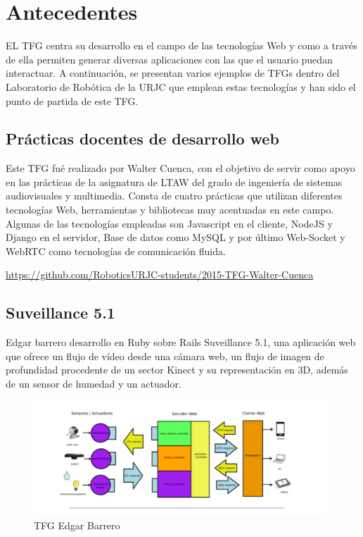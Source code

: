 \section{Antecedentes}
EL TFG centra su desarrollo en el campo de las tecnologías Web y como a través de ella permiten generar diversas aplicaciones con las que el usuario puedan interactuar. A continuación, se presentan varios ejemplos de TFGs dentro del Laboratorio de Robótica de la URJC que emplean estas tecnologías y han sido el punto de partida de este TFG.

\subsection{Prácticas docentes de desarrollo web}
Este TFG fué realizado por Walter Cuenca, con el objetivo de servir como apoyo en las prácticas de la asignatura de LTAW del grado de ingeniería de sistemas audiovisuales y multimedia. Consta de cuatro prácticas que utilizan diferentes tecnologías Web, herramientas y bibliotecas muy acentuadas en este campo. Algunas de las tecnologías empleadas son Javascript en el cliente, NodeJS y Django en el servidor, Base de datos como MySQL y por último Web-Socket y WebRTC como tecnologías de comunicación fluida.

\url{https://github.com/RoboticsURJC-students/2015-TFG-Walter-Cuenca}

\subsection{Suveillance 5.1}

Edgar barrero desarrollo en Ruby sobre Rails Suveillance 5.1, una aplicación web que ofrece un flujo de vídeo desde una cámara web, un flujo de imagen de profundidad procedente de un sector Kinect y su representación en 3D, además de un sensor de humedad y un actuador. 


\begin{figure}[H]
    \centering
    \includegraphics[width=110mm]{memoria/LaTeX/img/introduccion/edgar.png}
    \caption{TFG Edgar Barrero}
\end{figure}

